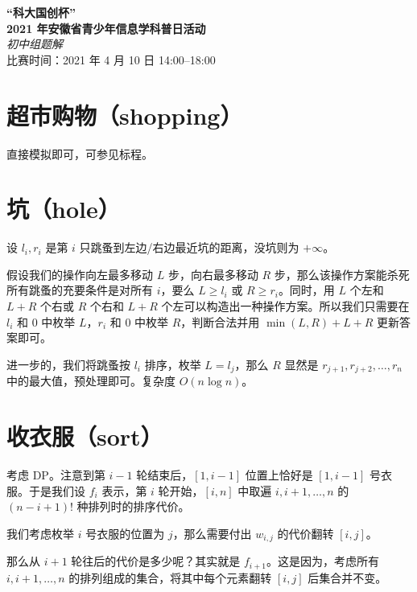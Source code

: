 \documentclass[11pt,a4paper,oneside]{article}
\begin{document}
\begin{center}
  \textbf{\huge “科大国创杯” \\ 2021 年安徽省青少年信息学科普日活动}\\
    {\LARGE \textit{初中组题解}\\\vspace{1em}}
    {\Large 比赛时间：2021 年 4 月 10 日 14:00–18:00}
  \end{center}

\section{超市购物（shopping）}

直接模拟即可，可参见标程。

\section{坑（hole）}

设 $l_i,r_i$ 是第 $i$ 只跳蚤到左边/右边最近坑的距离，没坑则为 $+\infty$。

假设我们的操作向左最多移动 $L$ 步，向右最多移动 $R$ 步，那么该操作方案能杀死所有跳蚤的充要条件是对所有 $i$，要么 $L \ge l_i$ 或 $R \ge r_i$。同时，用 $L$ 个左和 $L+R$ 个右或 $R$ 个右和 $L+R$ 个左可以构造出一种操作方案。所以我们只需要在 $l_i$ 和 $0$ 中枚举 $L$，$r_i$ 和 $0$ 中枚举 $R$，判断合法并用 $\min(L,R)+L+R$ 更新答案即可。

进一步的，我们将跳蚤按 $l_i$ 排序，枚举 $L=l_j$，那么 $R$ 显然是 $r_{j+1},r_{j+2},\ldots,r_n$ 中的最大值，预处理即可。复杂度 $O(n \log n)$。

\section{收衣服（sort）}

考虑 DP。注意到第 $i-1$ 轮结束后，$[1,i-1]$ 位置上恰好是 $[1,i-1]$ 号衣服。于是我们设 $f_i$ 表示，第 $i$ 轮开始，$[i,n]$ 中取遍 $i,i+1,\ldots,n$ 的 $(n-i+1)!$ 种排列时的排序代价。

我们考虑枚举 $i$ 号衣服的位置为 $j$，那么需要付出 $w_{i,j}$ 的代价翻转 $[i,j]$。

那么从 $i+1$ 轮往后的代价是多少呢？其实就是 $f_{i+1}$。这是因为，考虑所有 $i,i+1,\ldots,n$ 的排列组成的集合，将其中每个元素翻转 $[i,j]$ 后集合并不变。
\end{document}
